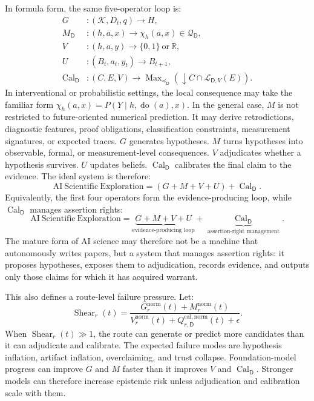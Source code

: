 \documentclass[11pt,a4paper]{article}
\newcommand{\doop}{\operatorname{do}}
\newcommand{\Know}{\mathcal{K}}
\newcommand{\Cal}{\operatorname{Cal}}
\newcommand{\Shear}{\operatorname{Shear}}
\newcommand{\Max}{\operatorname{Max}}
\newcommand{\Dom}{\mathsf{D}}
\begin{document}
In formula form, the same five-operator loop is:
\begin{align}
G &: (\Know,D_t,q)\rightarrow H,\\
M_{\Dom} &: (h,a,x)\rightarrow \chi_h(a,x)\in\mathcal{Q}_{\Dom},\\
V &: (h,a,y)\rightarrow \{0,1\}\ \text{or}\ \mathbb{R},\\
U &: (B_t,a_t,y_t)\rightarrow B_{t+1},\\
\Cal_{\Dom} &: (C,E,V)\rightarrow \Max_{\preceq_{\Dom}}(\downarrow C\cap\mathcal{L}_{\Dom,V}(E)).
\end{align}
In interventional or probabilistic settings, the local consequence may take the familiar form $\chi_h(a,x)=P(Y\mid h,\doop(a),x)$. In the general case, $M$ is not restricted to future-oriented numerical prediction. It may derive retrodictions, diagnostic features, proof obligations, classification constraints, measurement signatures, or expected traces. $G$ generates hypotheses. $M$ turns hypotheses into observable, formal, or measurement-level consequences. $V$ adjudicates whether a hypothesis survives. $U$ updates beliefs. $\Cal_{\Dom}$ calibrates the final claim to the evidence. The ideal system is therefore:
\begin{equation}
\boxed{\mathrm{AI\ Scientific\ Exploration}
=(G+M+V+U)+\Cal_{\Dom}.}
\end{equation}
Equivalently, the first four operators form the evidence-producing loop, while $\Cal_{\Dom}$ manages assertion rights:
\begin{equation}
\boxed{
\mathrm{AI\ Scientific\ Exploration}
=
\underbrace{G+M+V+U}_{\text{evidence-producing loop}}
+
\underbrace{\Cal_{\Dom}}_{\text{assertion-right management}}.
}
\end{equation}
The mature form of AI science may therefore not be a machine that autonomously writes papers, but a system that manages assertion rights: it proposes hypotheses, exposes them to adjudication, records evidence, and outputs only those claims for which it has acquired warrant.

This also defines a route-level failure pressure. Let:
\begin{equation}
\Shear_r(t)=
\frac{
G^{\mathrm{norm}}_r(t)+M^{\mathrm{norm}}_r(t)
}{
V^{\mathrm{norm}}_r(t)+Q^{\mathrm{cal,norm}}_{r,\Dom}(t)+\epsilon
}.
\end{equation}
When $\Shear_r(t)\gg 1$, the route can generate or predict more candidates than it can adjudicate and calibrate. The expected failure modes are hypothesis inflation, artifact inflation, overclaiming, and trust collapse. Foundation-model progress can improve $G$ and $M$ faster than it improves $V$ and $\Cal_{\Dom}$. Stronger models can therefore increase epistemic risk unless adjudication and calibration scale with them.
\end{document}
